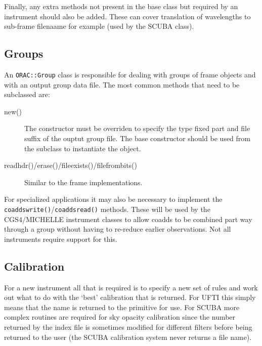 \documentclass[twoside,11pt]{article}
\renewcommand{\_}{\texttt{\symbol{95}}}
\begin{document}
Finally, any extra methods not present in the base class but required
by an instrument should also be added. These can cover translation of
wavelengths to sub-frame filenaame for example (used by the SCUBA class).


\subsection{Groups}

An \texttt{ORAC::Group} class is responsible for dealing with groups
of frame objects and with an output group data file.
The most common methods that need to be subclassed are:

\begin{description}

\item[new()] \mbox{}

The constructor must be overriden to specify the type fixed part and
file suffix of the ouptut group file. The base constructor should be
used from the subclass to instantiate the object.

\item[readhdr()/erase()/file\_exists()/file\_from\_bits()] \mbox{}

Similar to the frame implementations.


\end{description}

For specialized applications it may also be necessary to implement 
the \texttt{coaddswrite()}/\texttt{coaddsread()} methods. These will
be used by the CGS4/MICHELLE instrument classes to allow coadds to be 
combined part way through a group without having to re-reduce earlier
observations. Not all instruments require support for this.

\subsection{Calibration}

For a new instrument all that is required is to specify a new
set of rules and work out what to do with the `best' calibration that
is returned. For UFTI this simply means that the name is returned to
the primitive for use. For SCUBA more complex routines are required
for sky opacity calibration since the number returned by the index
file is sometimes modified for different filters before being returned 
to the user (the SCUBA calibration system never returns a file name).
\end{document}
